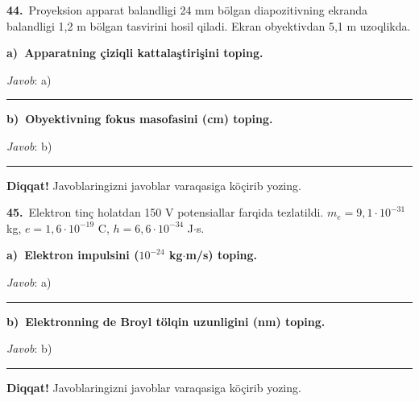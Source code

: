 \documentclass[11pt,a4paper]{article}
\newcommand{\blank}{\rule{5cm}{0.4pt}}
\begin{document}
\noindent\textbf{44.}\ Proyeksion apparat balandligi 24 mm bölgan diapozitivning ekranda balandligi 1,2 m bölgan tasvirini hosil qiladi. Ekran obyektivdan 5,1 m uzoqlikda.\par\smallskip
\medskip\noindent\textbf{a)\ Apparatning çiziqli kattalaştirişini toping.}\par
\noindent\textit{Javob}: a)\ \blank\par
\medskip\noindent\textbf{b)\ Obyektivning fokus masofasini (cm) toping.}\par
\noindent\textit{Javob}: b)\ \blank\par
\medskip\noindent\textbf{Diqqat!} Javoblaringizni javoblar varaqasiga köçirib yozing.\par\vspace{10pt}
\noindent\textbf{45.}\ Elektron tinç holatdan 150 V potensiallar farqida tezlatildi. $m_e=9{,}1\cdot10^{-31}$ kg, $e=1{,}6\cdot10^{-19}$ C, $h=6{,}6\cdot10^{-34}$ J$\cdot$s.\par\smallskip
\medskip\noindent\textbf{a)\ Elektron impulsini ($10^{-24}$ kg$\cdot$m/s) toping.}\par
\noindent\textit{Javob}: a)\ \blank\par
\medskip\noindent\textbf{b)\ Elektronning de Broyl tölqin uzunligini (nm) toping.}\par
\noindent\textit{Javob}: b)\ \blank\par
\medskip\noindent\textbf{Diqqat!} Javoblaringizni javoblar varaqasiga köçirib yozing.\par\vspace{10pt}
\end{document}

